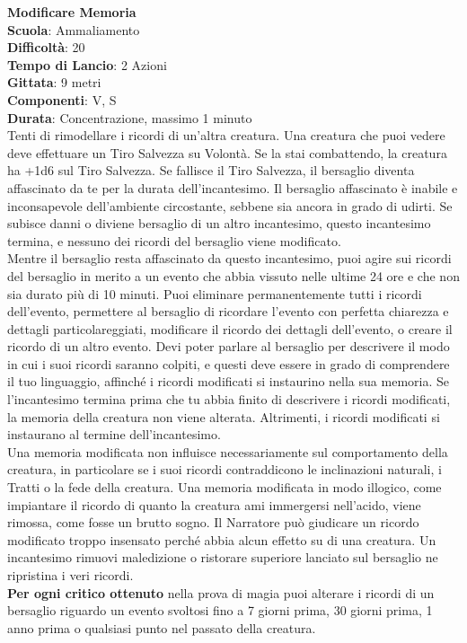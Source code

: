 \begin{multicols}{2}
\medskip\textbf{Modificare Memoria}\\
\textbf{Scuola}: Ammaliamento\\
\textbf{Difficoltà}: 20\\
\textbf{Tempo di Lancio}: 2 Azioni\\
\textbf{Gittata}: 9 metri\\
\textbf{Componenti}: V, S\\
\textbf{Durata}: Concentrazione, massimo 1 minuto\\
Tenti di rimodellare i ricordi di un'altra creatura. Una creatura che puoi vedere deve effettuare un Tiro Salvezza su Volontà. Se la stai combattendo, la creatura ha +1d6 sul Tiro Salvezza. Se fallisce il Tiro Salvezza, il bersaglio diventa affascinato da te per la durata dell'incantesimo. Il bersaglio affascinato è inabile e inconsapevole dell'ambiente circostante, sebbene sia ancora in grado di udirti. Se subisce danni o diviene bersaglio di un altro incantesimo, questo incantesimo termina, e nessuno dei ricordi del bersaglio viene modificato.\\
Mentre il bersaglio resta affascinato da questo incantesimo, puoi agire sui ricordi del bersaglio in merito a un evento che abbia vissuto nelle ultime 24 ore e che non sia durato più di 10 minuti. Puoi eliminare permanentemente tutti i ricordi dell'evento, permettere al bersaglio di ricordare l'evento con perfetta chiarezza e dettagli particolareggiati, modificare il ricordo dei dettagli dell'evento, o creare il ricordo di un altro evento. Devi poter parlare al bersaglio per descrivere il modo in cui i suoi ricordi saranno colpiti, e questi deve essere in grado di comprendere il tuo linguaggio, affinché i ricordi modificati si instaurino nella sua memoria. Se l'incantesimo termina prima che tu abbia finito di descrivere i ricordi modificati, la memoria della creatura non viene alterata. Altrimenti, i ricordi modificati si instaurano al termine dell'incantesimo.\\
Una memoria modificata non influisce necessariamente sul comportamento della creatura, in particolare se i suoi ricordi contraddicono le inclinazioni naturali, i Tratti o la fede della creatura. Una memoria modificata in modo illogico, come impiantare il ricordo di quanto la creatura ami immergersi nell'acido, viene rimossa, come fosse un brutto sogno. Il Narratore può giudicare un ricordo modificato troppo insensato perché abbia alcun effetto su di una creatura. Un incantesimo rimuovi maledizione o ristorare superiore lanciato sul bersaglio ne ripristina i veri ricordi.\\
\textbf{Per ogni critico ottenuto} nella prova di magia puoi alterare i ricordi di un bersaglio riguardo un evento svoltosi fino a 7 giorni prima, 30 giorni prima, 1 anno prima o qualsiasi punto
nel passato della creatura.


\end{multicols}

